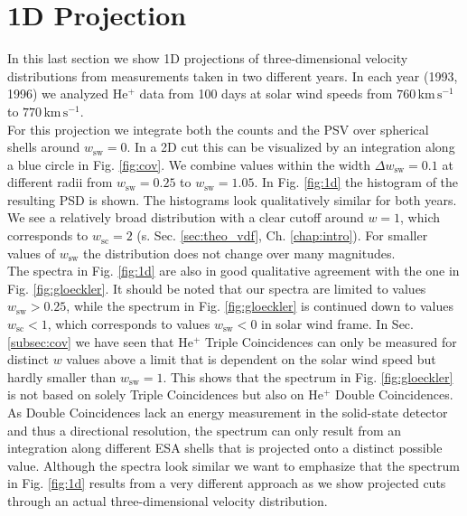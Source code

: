 \section{1D Projection}
In this last section we show 1D projections of three-dimensional velocity distributions from measurements taken in two different years. In each year (1993, 1996) we analyzed $\mathrm{He^{+}}$ data from 100 days at solar wind speeds from $760 \, \mathrm{km\,s^{-1}}$ to $770 \, \mathrm{km\,s^{-1}}$.\\
For this projection we integrate both the counts and the PSV over spherical shells around $w_\mathrm{sw}=0$. In a 2D cut this can be visualized by an integration along a blue circle in Fig. \ref{fig:cov}. We combine values within the width $\Delta w_\mathrm{sw} = 0.1$ at different radii from $w_\mathrm{sw} = 0.25$ to $w_\mathrm{sw} = 1.05$. In Fig. \ref{fig:1d} the histogram of the resulting PSD is shown. The histograms look qualitatively similar for both years. 
We see a relatively broad distribution with a clear cutoff around $w = 1$, which corresponds to $w_\mathrm{sc} = 2$ (s. Sec. \ref{sec:theo_vdf}, Ch. \ref{chap:intro}). For smaller values of $w_\mathrm{sw}$ the distribution does not change over many magnitudes. 
\\
The spectra in Fig. \ref{fig:1d} are also in good qualitative agreement with the one in Fig. \ref{fig:gloeckler}. It should be noted that our spectra are limited to values $w_\mathrm{sw} > 0.25$, while the spectrum in Fig. \ref{fig:gloeckler} is continued down to values $w_\mathrm{sc} < 1$, which corresponds to values $w_\mathrm{sw} < 0$ in solar wind frame. In Sec. \ref{subsec:cov} we have seen that $\mathrm{He^{+}}$ Triple Coincidences can only be measured for distinct $w$ values above a limit that is dependent on the solar wind speed but hardly smaller than $w_\mathrm{sw} = 1$. This shows that the spectrum in Fig. \ref{fig:gloeckler} is not based on solely Triple Coincidences but also on $\mathrm{He^{+}}$ Double Coincidences. As Double Coincidences lack an energy measurement in the solid-state detector and thus a directional resolution, the spectrum can only result from an integration along different ESA shells that is projected onto a distinct possible value.
Although the spectra look similar we want to emphasize that the spectrum in Fig. \ref{fig:1d} results from a very different approach as we show projected cuts through an actual three-dimensional velocity distribution.
